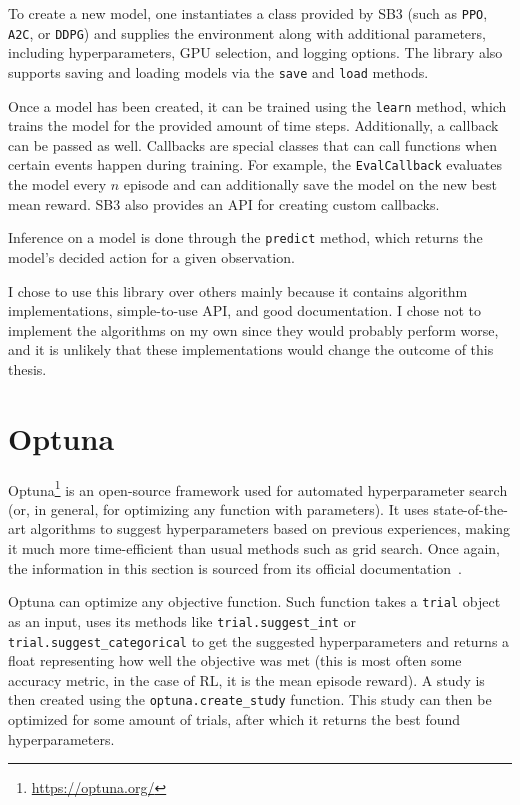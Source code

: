 \documentclass[
  digital,     %
  oneside,     %
  nosansbold,  %
  nocolorbold, %
  lof,         %
  lot,         %
]{fithesis4}
\begin{document}
To create a new model, one instantiates a class provided by SB3 (such as \texttt{PPO}, \texttt{A2C}, or \texttt{DDPG}) and supplies the environment along with additional parameters, including hyperparameters, GPU selection, and logging options. The library also supports saving and loading models via the \texttt{save} and \texttt{load} methods.

Once a model has been created, it can be trained using the \texttt{learn} method, which trains the model for the provided amount of time steps. Additionally, a callback can be passed as well. Callbacks are special classes that can call functions when certain events happen during training. For example, the \texttt{EvalCallback} evaluates the model every $n$ episode and can additionally save the model on the new best mean reward. SB3 also provides an API for creating custom callbacks.

Inference on a model is done through the \texttt{predict} method, which returns the model's decided action for a given observation.

I chose to use this library over others mainly because it contains algorithm implementations, simple-to-use API, and good documentation. I chose not to implement the algorithms on my own since they would probably perform worse, and it is unlikely that these implementations would change the outcome of this thesis.

\section{Optuna}
\label{sec:optuna}

Optuna\footnote{\url{https://optuna.org/}} is an open-source framework used for automated hyperparameter search (or, in general, for optimizing any function with parameters). It uses state-of-the-art algorithms to suggest hyperparameters based on previous experiences, making it much more time-efficient than usual methods such as grid search. Once again, the information in this section is sourced from its official documentation~\cite{optuna-docs}.

Optuna can optimize any objective function. Such function takes a \texttt{trial} object as an input, uses its methods like \texttt{trial.suggest\_int} or \texttt{trial.suggest\_categorical} to get the suggested hyperparameters and returns a float representing how well the objective was met (this is most often some accuracy metric, in the case of RL, it is the mean episode reward). A study is then created using the \texttt{optuna.create\_study} function. This study can then be optimized for some amount of trials, after which it returns the best found hyperparameters.
\end{document}
